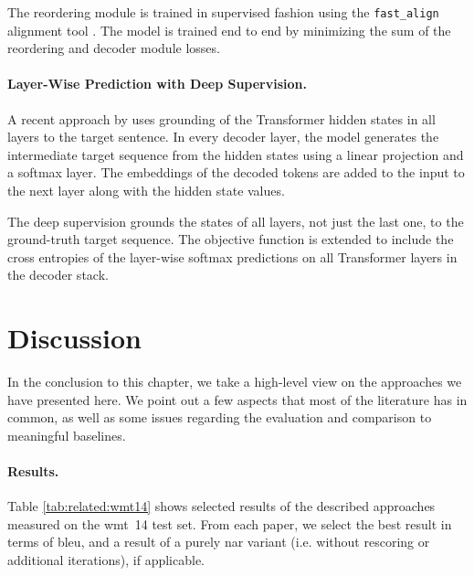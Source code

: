 The reordering module is trained in supervised fashion using the
\texttt{fast\_align} alignment tool \citep{dyer-etal-2013-simple}. The model is
trained end to end by minimizing the sum of the reordering and decoder module
losses.

\paragraph{Layer-Wise Prediction with Deep Supervision.}  %
A recent approach by \citet{huang-etal-2021-nonautoregressive} uses grounding
of the Transformer hidden states in all layers to the target sentence.  In
every decoder layer, the model generates the intermediate target sequence from
the hidden states using a linear projection and a softmax layer. The embeddings
of the decoded tokens are added to the input to the next layer along with the
hidden state values.

The deep supervision grounds the states of all layers, not just the last one,
to the ground-truth target sequence. The objective function is extended to
include the cross entropies of the layer-wise softmax predictions on all
Transformer layers in the decoder stack.


\section{Discussion}%
\label{sec:nat:discussion}

In the conclusion to this chapter, we take a high-level view on the approaches
we have presented here. We point out a few aspects that most of the literature
has in common, as well as some issues regarding the evaluation and comparison
to meaningful baselines.

\paragraph{Results.} Table \ref{tab:related:wmt14} shows selected results of
the described approaches measured on the \acs{wmt}~14 test set. From each
paper, we select the best result in terms of \acs{bleu}, and a result of a
purely \acl{nar} variant (i.e. without rescoring or additional iterations), if
applicable.

